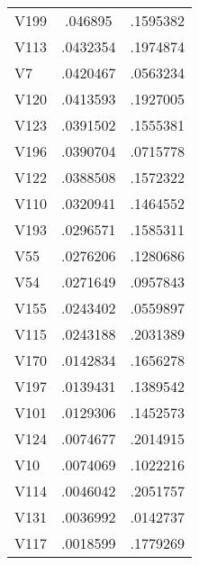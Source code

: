 \begin{tabularx}{\linewidth}{@{}lCC@{}}
V199&.046895&.1595382 \tabularnewline
V113&.0432354&.1974874 \tabularnewline
V7&.0420467&.0563234 \tabularnewline
V120&.0413593&.1927005 \tabularnewline
V123&.0391502&.1555381 \tabularnewline
V196&.0390704&.0715778 \tabularnewline
V122&.0388508&.1572322 \tabularnewline
V110&.0320941&.1464552 \tabularnewline
V193&.0296571&.1585311 \tabularnewline
V55&.0276206&.1280686 \tabularnewline
V54&.0271649&.0957843 \tabularnewline
V155&.0243402&.0559897 \tabularnewline
V115&.0243188&.2031389 \tabularnewline
V170&.0142834&.1656278 \tabularnewline
V197&.0139431&.1389542 \tabularnewline
V101&.0129306&.1452573 \tabularnewline
V124&.0074677&.2014915 \tabularnewline
V10&.0074069&.1022216 \tabularnewline
V114&.0046042&.2051757 \tabularnewline
V131&.0036992&.0142737 \tabularnewline
V117&.0018599&.1779269 \tabularnewline
\bottomrule 

\end{tabularx}

